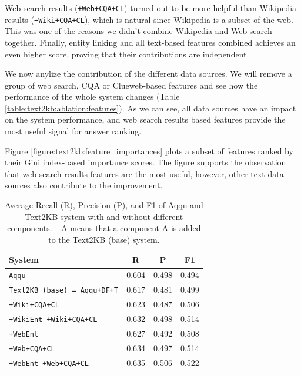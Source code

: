 Web search results (\texttt{+Web+CQA+CL}) turned out to be more helpful than Wikipedia results (\texttt{+Wiki+CQA+CL}), which is natural since Wikipedia is a subset of the web.
This was one of the reasons we didn't combine Wikipedia and Web search together.
Finally, entity linking and all text-based features combined achieves an even higher score, proving that their contributions are independent.

We now anylize the contribution of the different data sources.
We will remove a group of web search, CQA or Clueweb-based features and see how the performance of the whole system changes (Table \ref{table:text2kb:ablation:features}).
As we can see, all data sources have an impact on the system performance, and web search results based features provide the most useful signal for answer ranking.

Figure \ref{figure:text2kb:feature_importances} plots a subset of features ranked by their Gini index-based importance scores.
The figure supports the observation that web search results features are the most useful, however, other text data sources also contribute to the improvement.

\begin{table}[h]
\centering
\begin{tabular}{| p{6cm} | c | c | c | }
\hline
System & R & P & F1 \\
\hline
\texttt{Aqqu} & 0.604 & 0.498 & 0.494\\
\texttt{Text2KB (base) = Aqqu+DF+T} & 0.617 & 0.481 & 0.499 \\
\hline
\texttt{+Wiki+CQA+CL} & 0.623 & 0.487 & 0.506 \\
\texttt{+WikiEnt +Wiki+CQA+CL} & 0.632 & 0.498 & 0.514 \\
\hline
\texttt{+WebEnt} & 0.627 & 0.492 & 0.508 \\
\texttt{+Web+CQA+CL} & 0.634 & 0.497 & 0.514 \\
\texttt{+WebEnt +Web+CQA+CL} & 0.635 & 0.506 & 0.522 \\
\hline
\end{tabular}
\caption{Average Recall (R), Precision (P), and F1 of Aqqu and Text2KB system with and without different components. +A means that a component A is added to the Text2KB (base) system.}
\label{table:text2kb:ablation:entities_vs_features}
\end{table}

